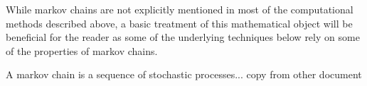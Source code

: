 While markov chains are not explicitly mentioned in most of the computational methods described above, a basic treatment of this mathematical object will be beneficial for the reader as some of the underlying techniques below rely on some of the properties of markov chains.

A markov chain is a sequence of stochastic processes... copy from other document
